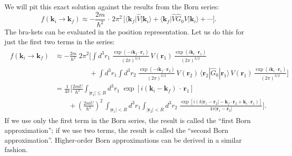 \documentclass[pra,12pt]{revtex4}
\begin{document}
We will pit this exact solution against the results from the Born
series:
\begin{equation}
  f(\mathbf{k}_i\rightarrow \mathbf{k}_f) \approx - \frac{2m}{\hbar^2} \,\cdot \, 2\pi^2 \, \Bigg[\big\langle \mathbf{k}_f\big| \hat{V}|\mathbf{k}_i\big\rangle + \big\langle \mathbf{k}_f \big| \hat{V}\hat{G}_0 \hat{V} \big|\mathbf{k}_i\big\rangle + \cdots \Bigg].
\end{equation}
The bra-kets can be evaluated in the position representation.  Let us
do this for just the first two terms in the series:
\begin{align*}
  \begin{aligned}f(\mathbf{k}_i\rightarrow \mathbf{k}_f) &\approx - \frac{2m}{\hbar^2} \; 2\pi^2 \Bigg[\int d^3r_1\; \frac{\exp(-i\mathbf{k}_f \cdot \mathbf{r}_1)}{(2\pi)^{3/2}} \, V(\mathbf{r}_1) \, \frac{\exp(i\mathbf{k}_i \cdot \mathbf{r}_1)}{(2\pi)^{3/2}} \\&\qquad\qquad\quad + \int d^3r_1 \!\! \int d^3r_2 \; \frac{\exp(-i\mathbf{k}_f \cdot \mathbf{r}_2)}{(2\pi)^{3/2}} \, V(\mathbf{r}_2) \, \langle\mathbf{r}_2|\hat{G}_0|\mathbf{r}_1 \rangle \, V(\mathbf{r}_1)\, \frac{\exp(i\mathbf{k}_i \cdot \mathbf{r}_1)}{(2\pi)^{3/2}}\Bigg] \\ &= \frac{1}{4\pi} \Bigg[\frac{2mU}{\hbar^2} \int_{|\mathbf{r}_1| \le R} d^3r_1 \; \exp\left[i(\mathbf{k}_i-\mathbf{k}_f)\, \cdot\, \mathbf{r}_1\right] \\ &\qquad + \left(\frac{2mU}{\hbar^2}\right)^2\, \int_{|\mathbf{r}_1|<R} d^3 r_1 \int_{|\mathbf{r}_2|<R} d^3 r_2 \; \frac{\exp\left[i(k|\mathbf{r}_1-\mathbf{r}_2| - \mathbf{k}_f \cdot \mathbf{r}_2 +\mathbf{k}_i \cdot \mathbf{r}_1)\right]}{4\pi|\mathbf{r}_1-\mathbf{r}_2|} \Bigg]. \end{aligned}
\end{align*}
If we use only the first term in the Born series, the result is
called the ``first Born approximation''; if we use two terms, the
result is called the ``second Born approximation''.  Higher-order Born
approximations can be derived in a similar fashion.
\end{document}
